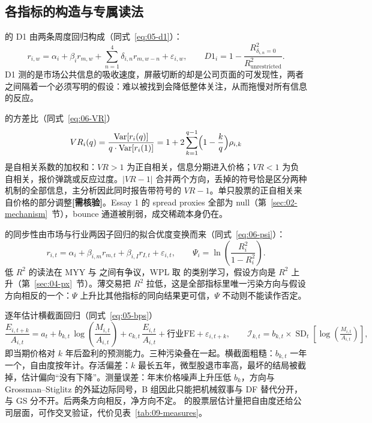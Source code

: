 \documentclass[a4paper,11pt]{ctexart}
\begin{document}
\subsection{各指标的构造与专属读法}\label{sec:09-delay}

\citet{houmoskowitz2005} 的 D1 由两条周度回归构成（同式~\eqref{eq:05-d1}）：
\begin{equation}\label{eq:09-d1}
r_{i,w} = \alpha_i + \beta_i r_{m,w} + \sum_{n=1}^{4} \delta_{i,n} r_{m,w-n} + \varepsilon_{i,w},
\qquad
D1_i = 1 - \frac{R^2_{\delta_{i,n}=0}}{R^2_{\text{unrestricted}}}.
\end{equation}
D1 测的是市场公共信息的吸收速度，屏蔽切断的却是公司页面的可发现性，两者之间隔着一个必须写明的假设：难以被找到会降低整体关注，从而拖慢对所有信息的反应。

\citet{lomackinlay1988} 的方差比（同式~\eqref{eq:06-VR}）
\begin{equation}\label{eq:09-vr}
VR_i(q) = \frac{\operatorname{Var}[r_i(q)]}{q \cdot \operatorname{Var}[r_i(1)]}
= 1 + 2\sum_{k=1}^{q-1}\Bigl(1-\frac{k}{q}\Bigr)\rho_{i,k}
\end{equation}
是自相关系数的加权和：$VR>1$ 为正自相关，信息分期进入价格；$VR<1$ 为负自相关，报价弹跳或反应过度。$|VR-1|$ 合并两个方向，丢掉的符号恰是区分两种机制的全部信息，主分析因此同时报告带符号的 $VR-1$。单只股票的正自相关来自价格的部分调整\textbf{[需核验]}。Essay 1 的 spread proxies 全部为 null（第~\ref{sec:02-mechanism}~节），bounce 通道被削弱，成交稀疏本身仍在。

\citet{morckyeungyu2000} 的同步性由市场与行业两因子回归的拟合优度变换而来（同式~\eqref{eq:06-psi}）：
\begin{equation}\label{eq:09-psi}
r_{i,t} = \alpha_i + \beta_{i,m} r_{m,t} + \beta_{i,I} r_{I,t} + \varepsilon_{i,t},
\qquad
\Psi_i = \ln\!\left(\frac{R_i^2}{1-R_i^2}\right).
\end{equation}
低 $R^2$ 的读法在 MYY 与 \citet{roll1988} 之间有争议，WPL 取 \citet{pengxiong2006} 的类别学习，假设方向是 $R^2$ 上升（第~\ref{sec:04-px}~节）。薄交易把 $R^2$ 拉低，这是全部指标里唯一污染方向与假设方向相反的一个：$\Psi$ 上升比其他指标的同向结果更可信，$\Psi$ 不动则不能读作否定。

\citet{baiphilipponsavov2016} 逐年估计横截面回归（同式~\eqref{eq:05-bps}）
\begin{equation}\label{eq:09-bps}
\frac{E_{i,t+k}}{A_{i,t}} = a_t + b_{k,t}\,\log\!\left(\frac{M_{i,t}}{A_{i,t}}\right) + c_{k,t}\,\frac{E_{i,t}}{A_{i,t}} + \text{行业FE} + \varepsilon_{i,t+k},
\qquad
\mathcal{I}_{k,t} = b_{k,t}\times \operatorname{SD}_t\!\left[\log\!\left(\tfrac{M_{i,t}}{A_{i,t}}\right)\right],
\end{equation}
即当期价格对 $k$ 年后盈利的预测能力。三种污染叠在一起。横截面粗糙：$b_{k,t}$ 一年一个，自由度按年计。存活偏差：$k$ 最长五年，微型股退市率高，最坏的结局被截掉，估计偏向“没有下降”。测量误差：年末价格噪声上升压低 $b_k$，方向与 Grossman--Stiglitz 的外延边际同号，B 组因此只能把机械叙事与 DF 替代分开，与 GS 分不开。后两条方向相反，净方向不定。\citet{davilaparlatore2026} 的股票层估计量把自由度还给公司层面，可作交叉验证，代价见表~\ref{tab:09-measures}。
\end{document}
